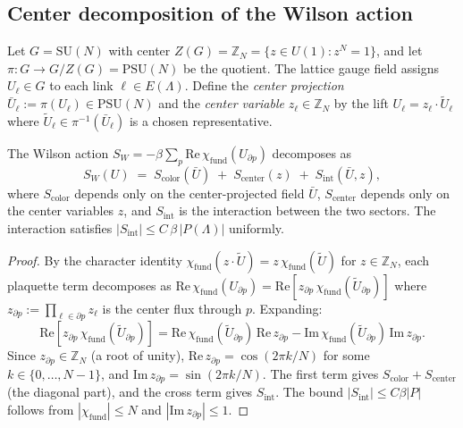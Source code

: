 \subsection{Center decomposition of the Wilson action}
\label{ssec:center_decomp}

Let $G=\mathrm{SU}(N)$ with center
$Z(G)=\mathbb{Z}_{N}=\{z\in U(1):z^{N}=1\}$, and let
$\pi:G\to G/Z(G)=\mathrm{PSU}(N)$ be the quotient. The lattice
gauge field assigns $U_{\ell}\in G$ to each link
$\ell\in E(\Lambda)$. Define the \emph{center projection}
$\bar{U}_{\ell}:=\pi(U_{\ell})\in\mathrm{PSU}(N)$ and the
\emph{center variable} $z_{\ell}\in\mathbb{Z}_{N}$ by the lift
$U_{\ell}=z_{\ell}\cdot\tilde{U}_{\ell}$ where
$\tilde{U}_{\ell}\in\pi^{-1}(\bar{U}_{\ell})$ is a chosen
representative.

\begin{lemma}
\label{lem:center_decomp}
The Wilson action
$S_{W}=-\beta\sum_{p}\mathrm{Re}\,\chi_{\mathrm{fund}}(U_{\partial p})$
decomposes as
\begin{equation}
\label{eq:center_decomp}
  S_{W}(U) \;=\; S_{\mathrm{color}}(\bar{U}) \;+\;
  S_{\mathrm{center}}(z) \;+\;
  S_{\mathrm{int}}(\bar{U},z),
\end{equation}
where $S_{\mathrm{color}}$ depends only on the center-projected
field $\bar{U}$, $S_{\mathrm{center}}$ depends only on the center
variables $z$, and $S_{\mathrm{int}}$ is the interaction between
the two sectors. The interaction satisfies
$|S_{\mathrm{int}}|\le C\,\beta\,|P(\Lambda)|$ uniformly.
\end{lemma}

\begin{proof}
By the character identity
$\chi_{\mathrm{fund}}(z\cdot\tilde{U})=z\,\chi_{\mathrm{fund}}(\tilde{U})$
for $z\in\mathbb{Z}_{N}$, each plaquette term decomposes as
$\mathrm{Re}\,\chi_{\mathrm{fund}}(U_{\partial p})
=\mathrm{Re}[z_{\partial p}\,\chi_{\mathrm{fund}}(\tilde{U}_{\partial p})]$
where $z_{\partial p}:=\prod_{\ell\in\partial p}z_{\ell}$ is the
center flux through $p$. Expanding:
\[
  \mathrm{Re}[z_{\partial p}\,\chi_{\mathrm{fund}}(\tilde{U}_{\partial p})]
  = \mathrm{Re}\,\chi_{\mathrm{fund}}(\tilde{U}_{\partial p})\,
    \mathrm{Re}\,z_{\partial p}
  - \mathrm{Im}\,\chi_{\mathrm{fund}}(\tilde{U}_{\partial p})\,
    \mathrm{Im}\,z_{\partial p}.
\]
Since $z_{\partial p}\in\mathbb{Z}_{N}$ (a root of unity),
$\mathrm{Re}\,z_{\partial p}=\cos(2\pi k/N)$ for some
$k\in\{0,\ldots,N-1\}$, and
$\mathrm{Im}\,z_{\partial p}=\sin(2\pi k/N)$. The first term gives
$S_{\mathrm{color}}+S_{\mathrm{center}}$ (the diagonal part), and
the cross term gives $S_{\mathrm{int}}$. The bound
$|S_{\mathrm{int}}|\le C\beta|P|$ follows from
$|\chi_{\mathrm{fund}}|\le N$ and $|\mathrm{Im}\,z_{\partial p}|\le 1$.
\end{proof}

